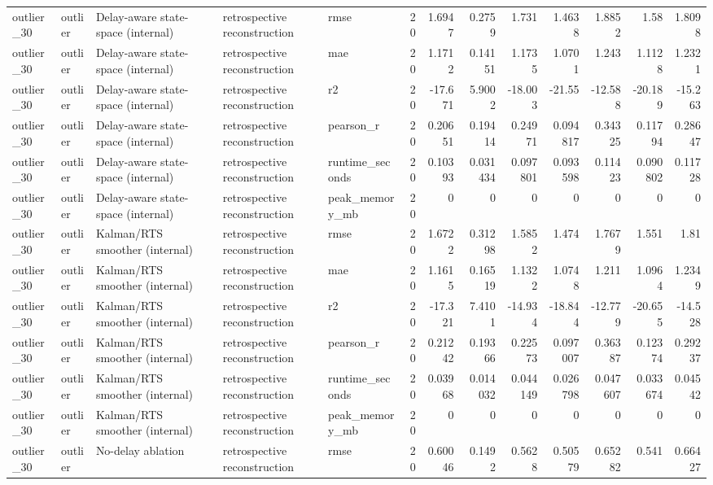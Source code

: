 \begin{table}[!htbp]
{{\begin{tabular}{lllllrrrrrrrr}
outlier_30 & outlier & Delay-aware state-space (internal) & retrospective reconstruction & rmse & 20 & 1.6947 & 0.2759 & 1.731 & 1.4638 & 1.8852 & 1.58 & 1.8098 \\
outlier_30 & outlier & Delay-aware state-space (internal) & retrospective reconstruction & mae & 20 & 1.1712 & 0.14151 & 1.1735 & 1.0701 & 1.243 & 1.1128 & 1.2321 \\
outlier_30 & outlier & Delay-aware state-space (internal) & retrospective reconstruction & r2 & 20 & -17.671 & 5.9002 & -18.003 & -21.55 & -12.588 & -20.189 & -15.263 \\
outlier_30 & outlier & Delay-aware state-space (internal) & retrospective reconstruction & pearson_r & 20 & 0.20651 & 0.19414 & 0.24971 & 0.094817 & 0.34325 & 0.11794 & 0.28647 \\
outlier_30 & outlier & Delay-aware state-space (internal) & retrospective reconstruction & runtime_seconds & 20 & 0.10393 & 0.031434 & 0.097801 & 0.093598 & 0.11423 & 0.090802 & 0.11728 \\
outlier_30 & outlier & Delay-aware state-space (internal) & retrospective reconstruction & peak_memory_mb & 20 & 0 & 0 & 0 & 0 & 0 & 0 & 0 \\
outlier_30 & outlier & Kalman/RTS smoother (internal) & retrospective reconstruction & rmse & 20 & 1.6722 & 0.31298 & 1.5852 & 1.474 & 1.7679 & 1.551 & 1.81 \\
outlier_30 & outlier & Kalman/RTS smoother (internal) & retrospective reconstruction & mae & 20 & 1.1615 & 0.16519 & 1.1322 & 1.0748 & 1.211 & 1.0964 & 1.2349 \\
outlier_30 & outlier & Kalman/RTS smoother (internal) & retrospective reconstruction & r2 & 20 & -17.321 & 7.4101 & -14.934 & -18.844 & -12.779 & -20.655 & -14.528 \\
outlier_30 & outlier & Kalman/RTS smoother (internal) & retrospective reconstruction & pearson_r & 20 & 0.21242 & 0.19366 & 0.22573 & 0.097007 & 0.36387 & 0.12374 & 0.29237 \\
outlier_30 & outlier & Kalman/RTS smoother (internal) & retrospective reconstruction & runtime_seconds & 20 & 0.03968 & 0.014032 & 0.044149 & 0.026798 & 0.047607 & 0.033674 & 0.04542 \\
outlier_30 & outlier & Kalman/RTS smoother (internal) & retrospective reconstruction & peak_memory_mb & 20 & 0 & 0 & 0 & 0 & 0 & 0 & 0 \\
outlier_30 & outlier & No-delay ablation & retrospective reconstruction & rmse & 20 & 0.60046 & 0.1492 & 0.5628 & 0.50579 & 0.65282 & 0.541 & 0.66427 \\

\end{tabular}}}
\end{table}
